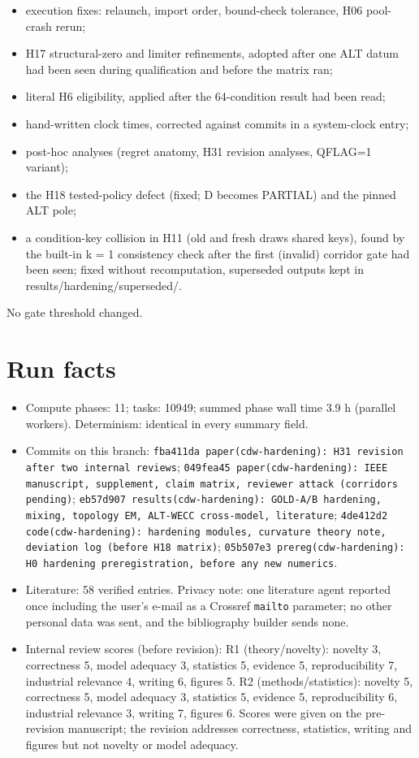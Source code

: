 \documentclass[10pt,a4paper]{article}
\begin{document}
\begin{itemize}
\item execution fixes: relaunch, import order, bound-check tolerance, H06 pool-crash rerun;
\item H17 structural-zero and limiter refinements, adopted after one ALT datum had been seen during qualification and before the matrix ran;
\item literal H6 eligibility, applied after the 64-condition result had been read;
\item hand-written clock times, corrected against commits in a system-clock entry;
\item post-hoc analyses (regret anatomy, H31 revision analyses, QFLAG=1 variant);
\item the H18 tested-policy defect (fixed; D becomes PARTIAL) and the pinned ALT pole;
\item a condition-key collision in H11 (old and fresh draws shared keys), found by the built-in k = 1 consistency check after the first (invalid) corridor gate had been seen; fixed without recomputation, superseded outputs kept in results/hardening/superseded/.
\end{itemize}
No gate threshold changed.

\section{Run facts}
\begin{itemize}
\item Compute phases: 11; tasks: 10949; summed phase wall time 3.9 h (parallel workers). Determinism: identical in every summary field.
\item Commits on this branch: \texttt{fba411da paper(cdw-hardening): H31 revision after two internal reviews}; \texttt{049fea45 paper(cdw-hardening): IEEE manuscript, supplement, claim matrix, reviewer attack (corridors pending)}; \texttt{eb57d907 results(cdw-hardening): GOLD-A/\allowbreak{}B hardening, mixing, topology EM, ALT-WECC cross-model, literature}; \texttt{4de412d2 code(cdw-hardening): hardening modules, curvature theory note, deviation log (before H18 matrix)}; \texttt{05b507e3 prereg(cdw-hardening): H0 hardening preregistration, before any new numerics}.
\item Literature: 58 verified entries. Privacy note: one literature agent reported once including the user's e-mail as a Crossref \texttt{mailto} parameter; no other personal data was sent, and the bibliography builder sends none.
\item Internal review scores (before revision): R1 (theory/novelty): novelty 3, correctness 5, model adequacy 3, statistics 5, evidence 5, reproducibility 7, industrial relevance 4, writing 6, figures 5. R2 (methods/statistics): novelty 5, correctness 5, model adequacy 3, statistics 5, evidence 5, reproducibility 6, industrial relevance 3, writing 7, figures 6. Scores were given on the pre-revision manuscript; the revision addresses correctness, statistics, writing and figures but not novelty or model adequacy.
\end{itemize}
\end{document}
